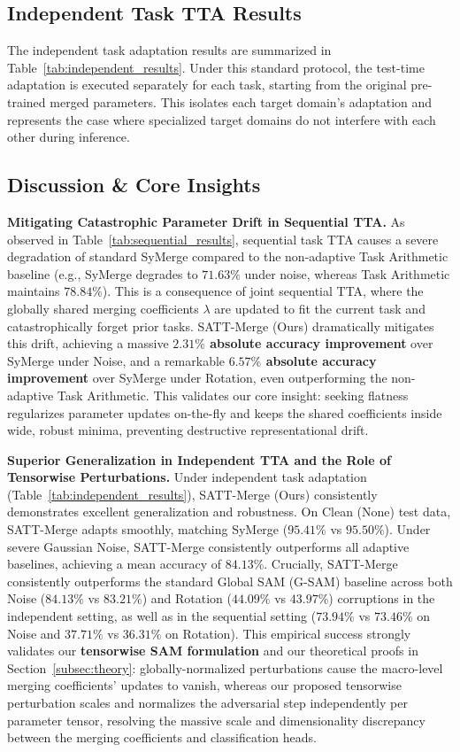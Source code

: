\documentclass{article}
\begin{document}
\subsection{Independent Task TTA Results}

The independent task adaptation results are summarized in Table~\ref{tab:independent_results}. Under this standard protocol, the test-time adaptation is executed separately for each task, starting from the original pre-trained merged parameters. This isolates each target domain's adaptation and represents the case where specialized target domains do not interfere with each other during inference.

\subsection{Discussion \& Core Insights}

\textbf{Mitigating Catastrophic Parameter Drift in Sequential TTA.} As observed in Table~\ref{tab:sequential_results}, sequential task TTA causes a severe degradation of standard SyMerge compared to the non-adaptive Task Arithmetic baseline (e.g., SyMerge degrades to $71.63\%$ under noise, whereas Task Arithmetic maintains $78.84\%$). This is a consequence of joint sequential TTA, where the globally shared merging coefficients $\lambda$ are updated to fit the current task and catastrophically forget prior tasks. SATT-Merge (Ours) dramatically mitigates this drift, achieving a massive \textbf{$2.31\%$ absolute accuracy improvement} over SyMerge under Noise, and a remarkable \textbf{$6.57\%$ absolute accuracy improvement} over SyMerge under Rotation, even outperforming the non-adaptive Task Arithmetic. This validates our core insight: seeking flatness regularizes parameter updates on-the-fly and keeps the shared coefficients inside wide, robust minima, preventing destructive representational drift.

\textbf{Superior Generalization in Independent TTA and the Role of Tensorwise Perturbations.} Under independent task adaptation (Table~\ref{tab:independent_results}), SATT-Merge (Ours) consistently demonstrates excellent generalization and robustness. On Clean (None) test data, SATT-Merge adapts smoothly, matching SyMerge ($95.41\%$ vs $95.50\%$). Under severe Gaussian Noise, SATT-Merge consistently outperforms all adaptive baselines, achieving a mean accuracy of \textbf{$84.13\%$}. Crucially, SATT-Merge consistently outperforms the standard Global SAM (G-SAM) baseline across both Noise ($84.13\%$ vs $83.21\%$) and Rotation ($44.09\%$ vs $43.97\%$) corruptions in the independent setting, as well as in the sequential setting ($73.94\%$ vs $73.46\%$ on Noise and $37.71\%$ vs $36.31\%$ on Rotation). This empirical success strongly validates our \textbf{tensorwise SAM formulation} and our theoretical proofs in Section~\ref{subsec:theory}: globally-normalized perturbations cause the macro-level merging coefficients' updates to vanish, whereas our proposed tensorwise perturbation scales and normalizes the adversarial step independently per parameter tensor, resolving the massive scale and dimensionality discrepancy between the merging coefficients and classification heads.
\end{document}

